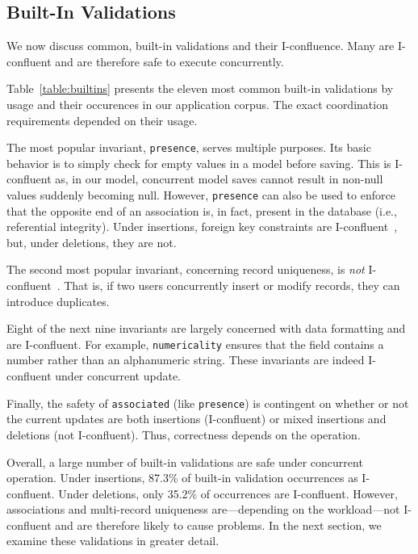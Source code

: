 \subsection{Built-In Validations}

We now discuss common, built-in validations and their
I-confluence. Many are I-confluent and are therefore safe to execute
concurrently.

Table~\ref{table:builtins} presents the eleven most common built-in
validations by usage and their occurences in our application
corpus. The exact coordination requirements depended on their usage.

The most popular invariant, \texttt{presence}, serves multiple purposes. Its
basic behavior is to simply check for empty values in a model before
saving. This is I-confluent as, in our model, concurrent model saves
cannot result in non-null values suddenly becoming null. However,
\texttt{presence} can also be used to enforce that the opposite end of
an association is, in fact, present in the database (i.e., referential
integrity). Under insertions, foreign key constraints are
I-confluent~\cite{coord-avoid}, but, under deletions, they are not.

The second most popular invariant, concerning record uniqueness, is
\textit{not} I-confluent~\cite{coord-avoid}. That is, if two users
concurrently insert or modify records, they can introduce duplicates.

Eight of the next nine invariants are largely concerned with data
formatting and are I-confluent. For example, \texttt{numericality}
ensures that the field contains a number rather than an alphanumeric
string. These invariants are indeed I-confluent under concurrent
update.

Finally, the safety of \texttt{associated} (like \texttt{presence}) is
contingent on whether or not the current updates are both insertions
(I-confluent) or mixed insertions and deletions (not
I-confluent). Thus, correctness depends on the operation.

Overall, a large number of built-in validations are safe under
concurrent operation. Under insertions, 87.3\% of built-in validation
occurrences as I-confluent. Under deletions, only 35.2\% of
occurrences are I-confluent.  However, associations and multi-record
uniqueness are---depending on the workload---not I-confluent and are
therefore likely to cause problems. In the next section, we examine
these validations in greater detail.

